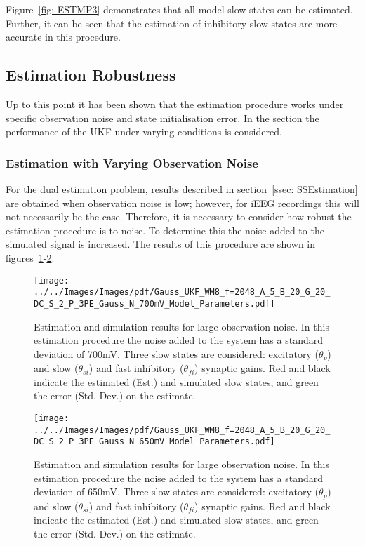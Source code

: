 Figure~\ref{fig: ESTMP3} demonstrates that all model slow states can be estimated. Further, it can be seen that the estimation of inhibitory slow states are more accurate in this procedure.

\subsection{Estimation Robustness}
\label{ssec: ESTT}

Up to this point it has been shown that the estimation procedure works under specific observation noise and state initialisation error. In the section the performance of the UKF under varying conditions is considered.

\subsubsection{Estimation with Varying Observation Noise}


For the dual estimation problem, results described in section~\ref{ssec: SSEstimation} are obtained when observation noise is low; however, for iEEG recordings this will not necessarily be the case. Therefore, it is necessary to consider how robust the estimation procedure is to noise. To determine this the noise added to the simulated signal is increased. The results of this procedure are shown in figures~\ref{fig: ESTFail}-\ref{fig: ESTPass}.
\begin{figure}%
	\centering
		\texttt{[image: ../../Images/Images/pdf/Gauss\_UKF\_WM8\_f=2048\_A\_5\_B\_20\_G\_20\_DC\_S\_2\_P\_3PE\_Gauss\_N\_700mV\_Model\_Parameters.pdf]}
	\caption{Estimation and simulation results for large observation noise. In this estimation procedure the noise added to the system has a standard deviation of 700mV. Three slow states are considered: excitatory ($\theta_{p}$) and slow ($\theta_{si}$) and fast inhibitory ($\theta_{fi}$) synaptic gains. Red and black indicate the estimated (Est.) and simulated slow states, and green the error (Std. Dev.) on the estimate.}
	\label{fig: ESTFail}
\end{figure}
\begin{figure}
	\centering
		\texttt{[image: ../../Images/Images/pdf/Gauss\_UKF\_WM8\_f=2048\_A\_5\_B\_20\_G\_20\_DC\_S\_2\_P\_3PE\_Gauss\_N\_650mV\_Model\_Parameters.pdf]}
	\caption{Estimation and simulation results for large observation noise. In this estimation procedure the noise added to the system has a standard deviation of 650mV. Three slow states are considered: excitatory ($\theta_{p}$) and slow ($\theta_{si}$) and fast inhibitory ($\theta_{fi}$) synaptic gains. Red and black indicate the estimated (Est.) and simulated slow states, and green the error (Std. Dev.) on the estimate.}
	\label{fig: ESTPass}
\end{figure}%

